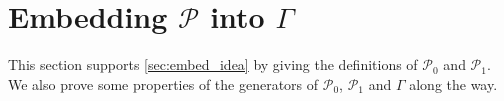 \documentclass[11pt,letterpaper]{article}
\newcommand{\ket}[1]{|#1\rangle}
\newcommand{\ketbra}[2]{|#1\rangle\langle#2|}
\DeclareMathOperator{\Tr}{Tr}
\DeclareMathOperator{\supp}{supp}
\newcommand{\1}{\mathbb{1}}
\newcommand{\Pg}{\mathcal{P}}
\newcommand{\CHSH}{CHSH^{(d)}}
\newcommand{\SVT}{SVT}
\newcommand{\tA}{\tilde{A}}
\newcommand{\tU}{\tilde{U}}
\theoremstyle{definition}
\begin{document}




\appendix

\section{Embedding $\Pg$ into $\Gamma$}
\label{sec:embedding}
This section supports \cref{sec:embed_idea} by giving the definitions
of $\Pg_0$ and $\Pg_1$.
We also prove some properties of the generators of $\Pg_0$, $\Pg_1$ and 
$\Gamma$ along the way.
\end{document}
